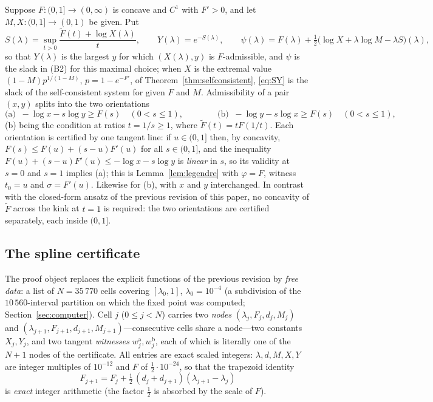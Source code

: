 \documentclass[11pt]{article}
\theoremstyle{definition}
\newcommand{\Ft}{\widetilde F}
\newcommand{\lam}{\lambda}
\begin{document}
Suppose $F\colon(0,1]\to(0,\infty)$ is concave and $C^1$ with $F'>0$, and let $M,X\colon(0,1]\to(0,1)$ be given.  Put
\begin{equation}\label{eq:SY}
S(\lam)=\sup_{t>0}\frac{\Ft(t)+\log X(\lam)}t,\qquad Y(\lam)=e^{-S(\lam)},\qquad\psi(\lam)=F(\lam)+\tfrac12\bigl(\log X+\lam\log M-\lam S\bigr)(\lam),
\end{equation}
so that $Y(\lam)$ is the largest $y$ for which $(X(\lam),y)$ is $F$-admissible, and $\psi$ is the slack in (B2) for this maximal choice; when $X$ is the extremal value $(1-M)p^{1/(1-M)}$, $p=1-e^{-F'}$, of Theorem~\ref{thm:selfconsistent}, \eqref{eq:SY} is the slack of the self-consistent system for given $F$ and $M$.  Admissibility of a pair $(x,y)$ splits into the two orientations
\[
\text{(a) }\ -\log x-s\log y\ge F(s)\quad(0<s\le1),\qquad\qquad\text{(b) }\ -\log y-s\log x\ge F(s)\quad(0<s\le1),
\]
(b) being the condition at ratios $t=1/s\ge1$, where $\Ft(t)=tF(1/t)$.  Each orientation is certified by one tangent line: if $u\in(0,1]$ then, by concavity, $F(s)\le F(u)+(s-u)F'(u)$ for all $s\in(0,1]$, and the inequality $F(u)+(s-u)F'(u)\le-\log x-s\log y$ is \emph{linear} in $s$, so its validity at $s=0$ and $s=1$ implies (a); this is Lemma~\ref{lem:legendre} with $\varphi=F$, witness $t_0=u$ and $\sigma=F'(u)$.  Likewise for (b), with $x$ and $y$ interchanged.  In contrast with the closed-form ansatz of the previous revision of this paper, no concavity of $\Ft$ across the kink at $t=1$ is required: the two orientations are certified separately, each inside $(0,1]$.

\subsection{The spline certificate}\label{sec:spline}

The proof object replaces the explicit functions of the previous revision by \emph{free data}: a list of $N=35\,770$ cells covering $[\lam_0,1]$, $\lam_0=10^{-4}$ (a subdivision of the $10\,560$-interval partition on which the fixed point was computed; Section~\ref{sec:computer}).  Cell $j$ ($0\le j<N$) carries two \emph{nodes} $(\lam_j,F_j,d_j,M_j)$ and $(\lam_{j+1},F_{j+1},d_{j+1},M_{j+1})$---consecutive cells share a node---two constants $X_j,Y_j$, and two tangent \emph{witnesses} $w^{\mathrm a}_j,w^{\mathrm b}_j$, each of which is literally one of the $N+1$ nodes of the certificate.  All entries are exact scaled integers: $\lam,d,M,X,Y$ are integer multiples of $10^{-12}$ and $F$ of $\tfrac12\cdot10^{-24}$, so that the trapezoid identity
\begin{equation}\label{eq:chain}
F_{j+1}=F_j+\tfrac12\,(d_j+d_{j+1})(\lam_{j+1}-\lam_j)
\end{equation}
is \emph{exact} integer arithmetic (the factor $\tfrac12$ is absorbed by the scale of $F$).
\end{document}
